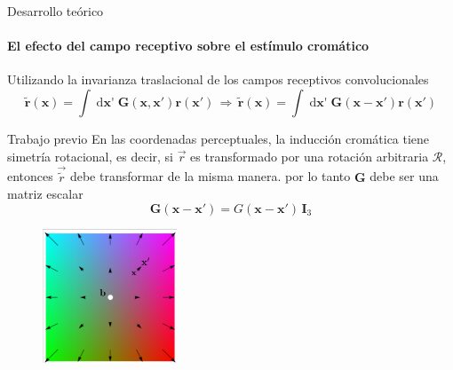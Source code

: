 \documentclass[
    11pt, %
    aspectratio=169, %
]{beamer}
\begin{document}
\begin{frame}{Desarrollo teórico}
    \framesubtitle{El efecto del campo receptivo sobre el estímulo cromático}
    Utilizando la invarianza traslacional de los campos receptivos convolucionales
 \begin{equation*}
     \mathbf{\tilde{r}}(\mathbf{x}) = \displaystyle \int \mathop{d\mathbf{x}'}   \mathbf{G}(\mathbf{x},\mathbf{x}') \mathbf{r}(\mathbf{x}') \,\Rightarrow\, \mathbf{\tilde{r}}(\mathbf{x}) = \displaystyle \int \mathop{d\mathbf{x}'}   \mathbf{G}(\mathbf{x}-\mathbf{x}') \mathbf{r}(\mathbf{x}')
\end{equation*}
\end{frame}



\begin{frame}{Trabajo previo}
    En las coordenadas perceptuales, la inducción cromática tiene simetría rotacional, es decir, si
$\vec{r}$ es transformado por una rotación arbitraria $\mathcal{R}$, entonces $\vec{\tilde{r}}$ debe transformar de la misma manera. por lo tanto $\mathbf{G}$ debe ser una matriz escalar
\begin{equation*}
     \mathbf{G}(\mathbf{x}-\mathbf{x}') = \textit{G}(\mathbf{x}-\mathbf{x}') \, \mathbf I_3 
\end{equation*}
\begin{figure}
    \centering
    \includegraphics[width = 4cm]{Images/intro/solo_radial.png}
\end{figure}
\end{frame}

\end{document}
